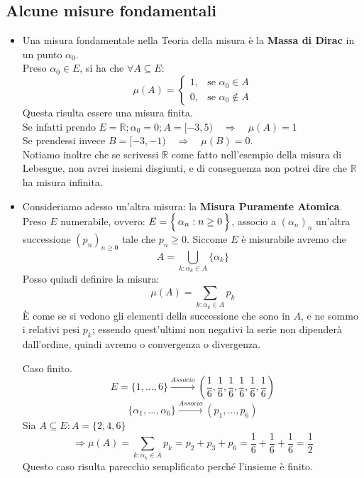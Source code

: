 \subsection{Alcune misure fondamentali}
\begin{itemize}[label=\(\bigstar\), align=left, labelsep=0.5em, labelwidth=!, leftmargin=0pt]
\item Una misura fondamentale nella Teoria della misura è la \textbf{Massa di Dirac} in un punto $\alpha_0$.\\
Preso  $\alpha_0 \in E$, si ha che $\forall A \subseteq E$:
\[ \mu(A) = 
\begin{cases} 
    1, & \text{se } \alpha_0 \in A \\ 
    0, & \text{se } \alpha_0 \notin A
\end{cases}
\]
Questa risulta essere una misura finita.\\
Se infatti prendo $E = \mathbb{R};\alpha_0 = 0;A = [-3, 5)\quad \Rightarrow \quad \mu(A) = 1$\\
Se prendessi invece $B = [-3, -1)\quad \Rightarrow \quad \mu(B) = 0$.\\
Notiamo inoltre che se scrivessi $\mathbb{R}$ come fatto nell'esempio della misura di Lebesgue, non avrei insiemi disgiunti, e di conseguenza non potrei dire che $\mathbb{R}$ ha misura infinita.
\item Consideriamo adesso un'altra misura: la \textbf{Misura Puramente Atomica}. Preso $E$ numerabile, ovvero: $E = \Bigl\{\,\alpha_n : n\geq 0\,\Bigr\}$, associo a $(\alpha_n)_n$ un'altra successione $(p_n)_{n\geq 0}$ tale che $p_n\geq0$. Siccome $E$ è misurabile avremo che \[A = \bigcup_{k:\alpha_k\in A}\{\alpha_k\}\]
Posso quindi definire la misura:
\[\mu(A) = \sum_{k:\alpha_k\in A} p_k\]
È come se si vedono gli elementi della successione che sono in $A$, e ne sommo i relativi pesi $p_k$; essendo quest'ultimi non negativi la serie non dipenderà dall'ordine, quindi avremo o convergenza o divergenza.
\newpage
\begin{esempio}
    Caso finito.\\
    \[E  = \{1, ..., 6\} \xrightarrow{Associo} \left(\frac{1}{6}, \frac{1}{6}, \frac{1}{6}, \frac{1}{6}, \frac{1}{6}, \frac{1}{6}\right)
    \]
    \[\{\alpha_1, ..., \alpha_6\} \xrightarrow{Associo} (p_1, ..., p_6)\]
    Sia $A\subseteq E: A = \{2, 4, 6\}$\\
    \[\Rightarrow \mu(A) = \sum_{k:\alpha_k\in A} p_k = p_2 + p_3 + p_6 = \frac{1}{6} + \frac{1}{6} + \frac{1}{6} = \frac{1}{2} \]
    Questo caso risulta parecchio semplificato perché l'insieme è finito.
\end{esempio}


\end{itemize}
